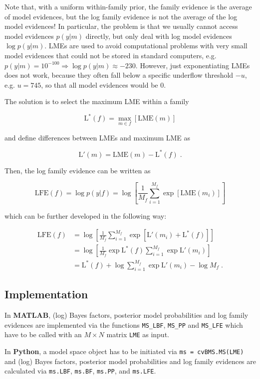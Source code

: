 \vspace{1em}
Note that, with a uniform within-family prior, the family evidence is the average of model evidences, but the log family evidence is not the average of the log model evidences! In particular, the problem is that we usually cannot access model evidences $p(y|m)$ directly, but only deal with log model evidences $\log p(y|m)$. LMEs are used to avoid computational problems with very small model evidences that could not be stored in standard computers, e.g. $p(y|m) = 10^{-100} \Rightarrow \log p(y|m) \approx -230$. However, just exponentiating LMEs does not work, because they often fall below a specific underflow threshold $-u$, e.g. $u = 745$, so that all model evidences would be $0$.

The solution is to select the maximum LME within a family

\begin{equation} \label{eq:LME-max}
\mathrm{L}^{*}(f) = \max_{m \in f} \left[ \mathrm{LME}(m) \right]
\end{equation}

and define differences between LMEs and maximum LME as

\begin{equation} \label{eq:LME-diff}
\mathrm{L}'(m) = \mathrm{LME}(m) - \mathrm{L}^{*}(f) \; .
\end{equation}

Then, the log family evidence can be written as

\begin{equation} \label{eq:LFE-alt}
\mathrm{LFE}(f) = \log p(y|f) = \log \left[ \frac{1}{M_f} \sum_{i=1}^{M_f} \exp \left[ \mathrm{LME}(m_i) \right] \right]
\end{equation}

which can be further developed in the following way:

\begin{equation} \label{eq:LFE-LME}
\begin{split}
\mathrm{LFE}(f) &= \log \left[ \frac{1}{M_f} \sum_{i=1}^{M_f} \exp \left[ \mathrm{L}'(m_i) + \mathrm{L}^{*}(f) \right] \right] \\
&= \log \left[ \frac{1}{M_f} \exp \mathrm{L}^{*}(f) \sum_{i=1}^{M_f} \exp \mathrm{L}'(m_i) \right] \\
&= \mathrm{L}^{*}(f) + \log \sum_{i=1}^{M_f} \exp \mathrm{L}'(m_i) - \log M_f \; .
\end{split}
\end{equation}


\subsection{Implementation} \label{sec:MS-Imp}

In \textbf{MATLAB}, (log) Bayes factors, posterior model probabilities and log family evidences are implemented via the functions \verb|MS_LBF|, \verb|MS_PP| and \verb|MS_LFE| which have to be called with an $M \times N$ matrix \verb|LME| as input.

In \textbf{Python}, a model space object has to be initiated via \verb|ms = cvBMS.MS(LME)| and (log) Bayes factors, posterior model probabilities and log family evidences are calculated via \verb|ms.LBF|, \verb|ms.BF|, \verb|ms.PP|, and \verb|ms.LFE|.